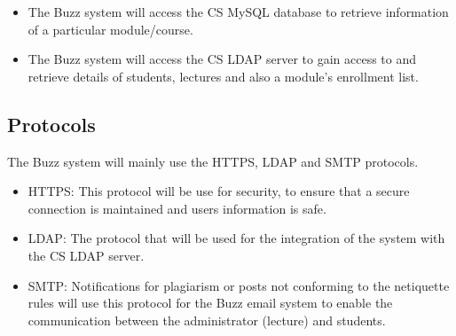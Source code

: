 
\begin{itemize}
\item The Buzz system will access the CS MySQL database to retrieve information of a particular module/course.
\item The Buzz system will access the CS LDAP server to gain access to and retrieve details of students,  lectures and also a module's enrollment  list.
\end{itemize}

\subsection{Protocols}
The Buzz system will mainly use the HTTPS, LDAP and SMTP protocols.
\begin{itemize}
\item HTTPS: This protocol will be use for security, to ensure that a secure connection is maintained and users information is safe. 
\item LDAP: The protocol that will be used for the integration of the system with the CS LDAP server.
\item SMTP: Notifications for plagiarism or posts not conforming to the netiquette rules will use this protocol for the Buzz email system to enable the communication between the administrator (lecture) and students.  
\end{itemize}